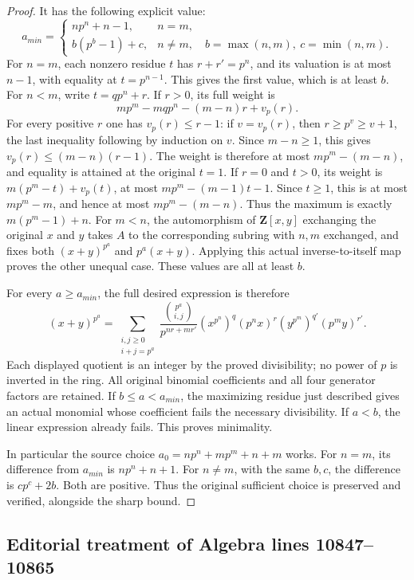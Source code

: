 \begin{proof}
It has the following explicit value:
$$
a_{min}=
\begin{cases}
n p^n+n-1,&n=m,\\
b(p^b-1)+c,&n\neq m,\quad
b=\max(n,m),\ c=\min(n,m).
\end{cases}
$$
For $n=m$, each nonzero residue $t$
has $r+r'=p^n$, and its valuation
is at most $n-1$, with equality at
$t=p^{n-1}$. This gives the first
value, which is at least $b$.
For $n<m$, write $t=q p^n+r$.
If $r>0$, its full weight is
$$
m p^m-m q p^n-(m-n)r+v_p(r).
$$
For every positive $r$ one has
$v_p(r)\leq r-1$: if $v=v_p(r)$,
then $r\geq p^v\geq v+1$, the
last inequality following by
induction on $v$. Since $m-n\geq1$,
this gives
$v_p(r)\leq(m-n)(r-1)$.
The weight is therefore at most
$m p^m-(m-n)$, and equality is
attained at the original $t=1$.
If $r=0$ and $t>0$, its weight is
$m(p^m-t)+v_p(t)$, at most
$m p^m-(m-1)t-1$. Since $t\geq1$,
this is at most $m p^m-m$, and
hence at most $m p^m-(m-n)$.
Thus the maximum is exactly
$m(p^m-1)+n$. For $m<n$, the
automorphism of $\mathbf Z[x,y]$
exchanging the original $x$ and
$y$ takes $A$ to the corresponding
subring with $n,m$ exchanged, and
fixes both $(x+y)^{p^a}$ and
$p^a(x+y)$. Applying this actual
inverse-to-itself map proves the
other unequal case. These values
are all at least $b$.

For every $a\geq a_{min}$, the full
desired expression is therefore
$$
(x+y)^{p^a}=
\sum_{\substack{i,j\geq0\\i+j=p^a}}
\frac{\binom{p^a}{i,j}}{p^{nr+mr'}}
(x^{p^n})^q(p^n x)^r
(y^{p^m})^{q'}(p^m y)^{r'}.
$$
Each displayed quotient is an
integer by the proved divisibility;
no power of $p$ is inverted in the
ring. All original binomial
coefficients and all four generator
factors are retained. If $b\leq a<a_{min}$,
the maximizing residue just described
gives an actual monomial whose
coefficient fails the necessary
divisibility. If $a<b$, the linear
expression already fails. This
proves minimality.

In particular the source choice
$a_0=n p^n+m p^m+n+m$ works.
For $n=m$, its difference from
$a_{min}$ is $n p^n+n+1$.
For $n\neq m$, with the same
$b,c$, the difference is $c p^c+2b$.
Both are positive. Thus the original
sufficient choice is preserved and
verified, alongside the sharp bound.
\end{proof}


\subsection{Editorial treatment of Algebra lines 10847--10865}


